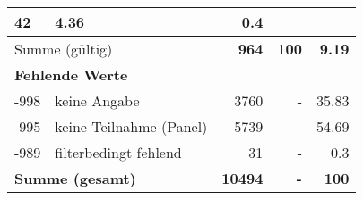 \begin{longtable}{lXrrr}
       \num{42} &
       \num[round-mode=places,round-precision=2]{4,36} &
         \num[round-mode=places,round-precision=2]{0,4} \\
     \midrule
     \multicolumn{2}{l}{Summe (gültig)} &
       \textbf{\num{964}} &
     \textbf{100} &
       \textbf{\num[round-mode=places,round-precision=2]{9,19}} \\
     \multicolumn{5}{l}{\textbf{Fehlende Werte}}\\
       -998 &
       keine Angabe &
         \num{3760} &
        - &
         \num[round-mode=places,round-precision=2]{35,83} \\
       -995 &
       keine Teilnahme (Panel) &
         \num{5739} &
        - &
         \num[round-mode=places,round-precision=2]{54,69} \\
       -989 &
       filterbedingt fehlend &
         \num{31} &
        - &
         \num[round-mode=places,round-precision=2]{0,3} \\
     \midrule
     \multicolumn{2}{l}{\textbf{Summe (gesamt)}} &
          \textbf{\num{10494}} &
        \textbf{-} &
        \textbf{100} \\
     \bottomrule
     \end{longtable}
     
